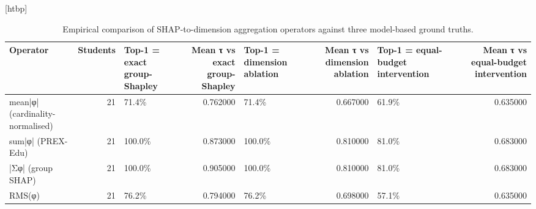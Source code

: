 \begin{table}
\small[htbp]
\caption{Empirical comparison of SHAP-to-dimension aggregation operators against three model-based ground truths.}
\label{tab:S24_aggregation_operators}
\begin{tabular}{lrlrlrlr}
\toprule
Operator & Students & Top-1 = exact group-Shapley & Mean τ vs exact group-Shapley & Top-1 = dimension ablation & Mean τ vs dimension ablation & Top-1 = equal-budget intervention & Mean τ vs equal-budget intervention \\
\midrule
mean|φ| (cardinality-normalised) & 21 & 71.4\% & 0.762000 & 71.4\% & 0.667000 & 61.9\% & 0.635000 \\
sum|φ| (PREX-Edu) & 21 & 100.0\% & 0.873000 & 100.0\% & 0.810000 & 81.0\% & 0.683000 \\
|Σφ| (group SHAP) & 21 & 100.0\% & 0.905000 & 100.0\% & 0.810000 & 81.0\% & 0.683000 \\
RMS(φ) & 21 & 76.2\% & 0.794000 & 76.2\% & 0.698000 & 57.1\% & 0.635000 \\
\bottomrule
\end{tabular}
\end{table}

